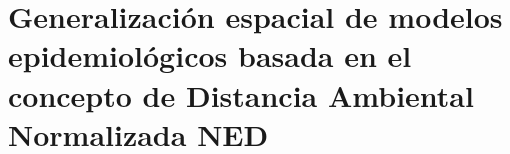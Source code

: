 


\justifying

\chapter{Generalización espacial de modelos epidemiológicos basada en el
        concepto de Distancia Ambiental Normalizada NED}


